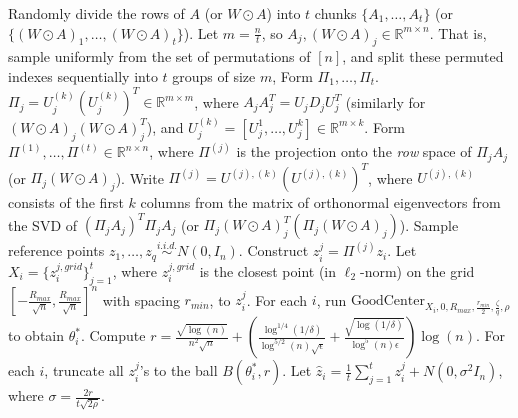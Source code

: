 \documentclass{article}
\begin{document}
\begin{algorithm}[h!]
\caption{Spectral Clustering via Subspace Estimation}
\label{alg:Subspace_Estimation_GoodC}
\begin{algorithmic}[1]
    \State Randomly divide the rows of $A$ (or $W \odot A$) into $t$ chunks $\{A_1, \dots, A_t\}$ (or $\{(W \odot A)_1, \dots, (W \odot A)_t\}$). Let $m = \frac{n}{t}$, so $A_j, (W \odot A)_j \in \mathbb{R}^{m \times n}$. That is, sample uniformly from the set of permutations of $[n]$, and split these permuted indexes sequentially into $t$ groups of size $m$,
    \State Form $\Pi_1, \dots, \Pi_t$. $\Pi_j = U_j^{(k)}(U_j^{(k)})^T \in \mathbb{R}^{m \times m}$, where $A_jA_j^T = U_jD_jU_j^T$ (similarly for $(W \odot A)_j(W \odot A)_j^T$), and $U_j^{(k)} = [U_j^1, \dots, U_j^k] \in \mathbb{R}^{m \times k}$.
    \State Form $\Pi^{(1)}, \dots, \Pi^{(t)} \in \mathbb{R}^{n \times n}$, where $\Pi^{(j)}$ is the projection onto the \emph{row} space of $\Pi_jA_j$ (or $\Pi_j(W \odot A)_j$). Write $\Pi^{(j)} = U^{(j), (k)}(U^{(j), (k)})^T$, where $U^{(j), (k)}$ consists of the first $k$ columns from the matrix of orthonormal eigenvectors from the SVD of $(\Pi_jA_j)^T\Pi_jA_j$ (or $\Pi_j(W \odot A)_j^T(\Pi_j(W \odot A)_j)$).
    \State Sample reference points $z_1, \dots, z_q \stackrel{i.i.d.}{\sim} N(0, I_n)$. Construct $z_i^j = \Pi^{(j)} z_i$.
    \State Let $X_i = \{z_i^{j, grid}\}_{j = 1}^t$, where $z_i^{j, grid}$ is the closest point (in $\ell_2$-norm) on the grid $\left[-\frac{R_{max}}{\sqrt{n}}, \frac{R_{max}}{\sqrt{n}}\right]^n$ with spacing $r_{min}$, to $z_i^{j}$.  
    \State For each $i$, run $\mathrm{GoodCenter}_{X_i, 0, R_{max}, \frac{r_{min}}{2}, \frac{\zeta}{q}, \rho}$ to obtain $\theta^*_i$. 
    \State Compute $r = \frac{\sqrt{\log(n)}}{n^2\sqrt{n}} + \left(\frac{\log^{1/4}(1/\delta)}{\log^{5/2}(n)\sqrt{\epsilon}} + \frac{\sqrt{\log(1/\delta)}}{\log^5(n)\epsilon}\right)\log(n)$.
    \State For each $i$, truncate all $z_i^j$'s to the ball $B(\theta^*_i, r)$. Let $\hat{z}_i = \frac{1}{t} \sum_{j=1}^t z_i^j + N(0, \sigma^2 I_n)$, where $\sigma = \frac{2r}{t\sqrt{2\rho}}$.

\end{algorithmic}
\end{algorithm}
\end{document}
